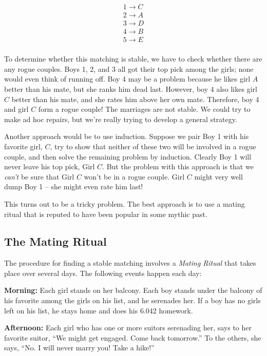 \begin{eqnarray*}
1 \rightarrow C \\
2 \rightarrow A \\
3 \rightarrow D \\
4 \rightarrow B \\
5 \rightarrow E \\
\end{eqnarray*}

To determine whether this matching is stable, we have to check whether
there are any rogue couples.  Boys 1, 2, and 3 all got their top pick
among the girls; none would even think of running off.  Boy 4 may be a
problem because he likes girl $A$ better than his mate, but she ranks him
dead last.  However, boy 4 also likes girl $C$ better than his mate, and
she rates him above her own mate.  Therefore, boy 4 and girl $C$ form a
rogue couple!  The marriages are not stable.  We could try to make ad hoc
repairs, but we're really trying to develop a general strategy.

Another approach would be to use induction.  Suppose we pair Boy 1 with
his favorite girl, $C$, try to show that neither of these two will be
involved in a rogue couple, and then solve the remaining problem by
induction.  Clearly Boy 1 will never leave his top pick, Girl $C$.  But
the problem with this approach is that we \emph{can't} be sure that Girl
$C$ won't be in a rogue couple.  Girl $C$ might very well dump Boy 1 --
she might even rate him last!

This turns out to be a tricky problem.  The best approach is to use a
mating ritual that is reputed to have been popular in some mythic past.
\fi

\subsection{The Mating Ritual}

The procedure for finding a stable matching involves a \emph{Mating
Ritual} that takes place over several days.  The following events happen
each day:

{\bf Morning: } Each girl stands on her balcony.  Each boy stands under
the balcony of his favorite among the girls on his list, and he serenades
her.  If a boy has no girls left on his list, he stays home and does his
6.042 homework.

{\bf Afternoon: } Each girl who has one or more suitors serenading her,
says to her favorite suitor, ``We might get engaged.  Come back
tomorrow.''  To the others, she says, ``No.  I will never marry you!  Take
a hike!''

